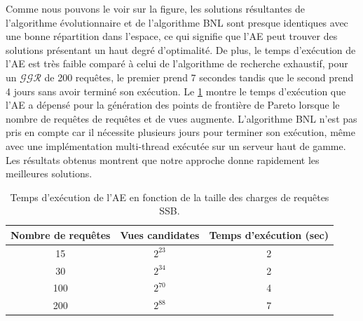 Comme nous pouvons le voir sur la figure, les solutions résultantes de l'algorithme évolutionnaire et de l'algorithme BNL sont presque identiques avec une bonne répartition dans l'espace, ce qui signifie que l'AE peut trouver des solutions présentant un haut degré d'optimalité.
De plus, le temps d'exécution de l'AE est très faible comparé à celui de l'algorithme de recherche exhaustif, pour un $\mathcal{GGR}$ de 200 requêtes, le premier prend 7 secondes tandis que le second prend 4 jours sans avoir terminé son exécution.
Le \ref{tab:moea-exec-time} montre le temps d'exécution que l'AE a dépensé pour la génération des points de frontière de Pareto lorsque le nombre de requêtes de requêtes et de vues augmente. L'algorithme BNL n'est pas pris en compte car il nécessite plusieurs jours pour terminer son exécution, même avec une implémentation multi-thread exécutée sur un serveur haut de gamme. Les résultats obtenus montrent que notre approche donne rapidement les meilleures solutions.

\begin{table}
\centering
\caption {Temps d'exécution de l'AE en fonction de la taille des charges de requêtes SSB.} \label{tab:moea-exec-time}
    \begin{tabular}{ccc}
    \toprule
    \textbf{Nombre de requêtes} & \textbf{Vues candidates} & \textbf{Temps d'exécution (sec)} \\
	\midrule
	15 & $2^{23}$ & 2 \\
    30 & $2^{34}$ & 2 \\
    100 & $2^{70}$ & 4 \\
    200 & $2^{88}$ & 7 \\
    \bottomrule
    \end{tabular}
\end{table}

